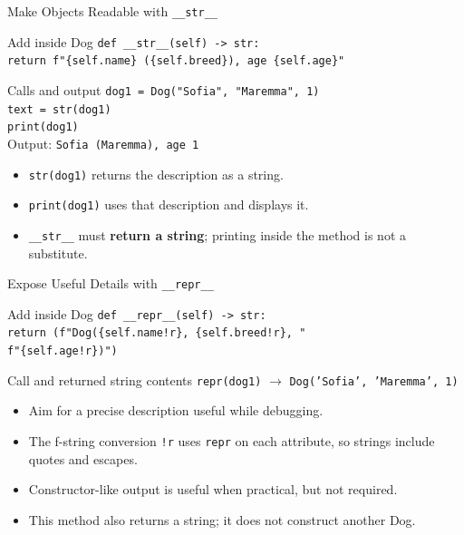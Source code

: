 \documentclass[aspectratio=169,10pt]{beamer}
\begin{document}
\begin{frame}{Make Objects Readable with \texttt{\_\_str\_\_}}
  \begin{block}{Add inside Dog}
    \texttt{def \_\_str\_\_(self) -> str:}\\
    \hspace*{0.20in}\texttt{return f"\{self.name\} (\{self.breed\}), age \{self.age\}"}
  \end{block}
  \begin{block}{Calls and output}
    \texttt{dog1 = Dog("Sofia", "Maremma", 1)}\\
    \texttt{text = str(dog1)}\\
    \texttt{print(dog1)}\\[0.06in]
    Output: \texttt{Sofia (Maremma), age 1}
  \end{block}
  \begin{itemize}
    \item \texttt{str(dog1)} returns the description as a string.
    \item \texttt{print(dog1)} uses that description and displays it.
    \item \texttt{\_\_str\_\_} must \textbf{return a string}; printing inside the method is not a substitute.
  \end{itemize}
\end{frame}

\begin{frame}{Expose Useful Details with \texttt{\_\_repr\_\_}}
  \begin{block}{Add inside Dog}
    \texttt{def \_\_repr\_\_(self) -> str:}\\
    \hspace*{0.20in}\texttt{return (f"Dog(\{self.name!r\}, \{self.breed!r\}, "}\\
    \hspace*{0.60in}\texttt{f"\{self.age!r\})")}
  \end{block}
  \begin{block}{Call and returned string contents}
    \texttt{repr(dog1)} $\rightarrow$ \texttt{Dog('Sofia', 'Maremma', 1)}
  \end{block}
  \begin{itemize}
    \item Aim for a precise description useful while debugging.
    \item The f-string conversion \texttt{!r} uses \texttt{repr} on each attribute, so strings include quotes and escapes.
    \item Constructor-like output is useful when practical, but not required.
    \item This method also returns a string; it does not construct another Dog.
  \end{itemize}
\end{frame}
\end{document}
